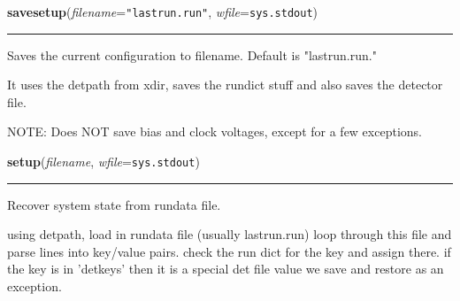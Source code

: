     \label{run:savesetup}

    \vspace{0.5ex}

    \begin{boxedminipage}{\textwidth}

    \raggedright \textbf{savesetup}(\textit{filename}=\texttt{"lastrun.run"}, \textit{wfile}=\texttt{sys.stdout})

    \vspace{-1.5ex}

    \rule{\textwidth}{0.5\fboxrule}
    Saves the current configuration to filename. Default is "lastrun.run."

    It uses the detpath from xdir, saves the rundict stuff and also saves 
    the detector file.

    NOTE: Does NOT save bias and clock voltages, except for a few 
    exceptions.

    \vspace{1ex}

    \end{boxedminipage}

    \label{run:setup}

    \vspace{0.5ex}

    \begin{boxedminipage}{\textwidth}

    \raggedright \textbf{setup}(\textit{filename}, \textit{wfile}=\texttt{sys.stdout})

    \vspace{-1.5ex}

    \rule{\textwidth}{0.5\fboxrule}
    Recover system state from rundata file.

    using detpath, load in rundata file (usually lastrun.run) loop through 
    this file and parse lines into key/value pairs. check the run dict for 
    the key and assign there. if the key is in 'detkeys' then it is a 
    special det file value we save and restore as an exception.

    \vspace{1ex}

    \end{boxedminipage}

    \label{run:recover}

    \vspace{0.5ex}

